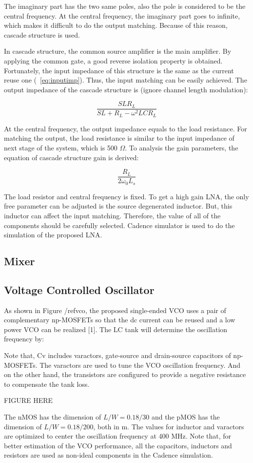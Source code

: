 The imaginary part has the two same poles, also the pole is considered to be the central frequency. At the central frequency, the imaginary part goes to infinite, which makes it difficult to do the output matching. Because of this reason, cascade structure is used.

In cascade structure, the common source amplifier is the main amplifier. By applying the common gate, a good reverse isolation property is obtained. Fortunately, the input impedance of this structure is the same as the current reuse one (~\ref{eq:inputimp}). Thus, the input matching can be easily achieved. The output impedance of the cascade structure is (ignore channel length modulation):

\begin{equation} 
  	\frac{SLR_L}{SL+R_L-\omega^2LCR_L}
\end{equation}

At the central frequency, the output impedance equals to the load resistance. For matching the output, the load resistance is similar to the input impedance of next stage of the system, which is 500 $\Omega$. To analysis the gain parameters, the equation of cascade structure gain is derived: 

\begin{equation} 
  	\frac{R_L}{2\omega_0L_s}
\end{equation}

The load resistor and central frequency is fixed. To get a high gain LNA, the only free parameter can be adjusted is the source degenerated inductor. But, this inductor can affect the input matching. Therefore, the value of all of the components should be carefully selected. Cadence simulator is used to do the simulation of the proposed LNA. 

\subsection{Mixer}

\subsection{Voltage Controlled Oscillator}
As shown in Figure /ref{vco}, the proposed single-ended VCO uses a pair of complementary np-MOSFETs so that the dc current can be reused and a low power VCO can be realized [1]. The LC tank will determine the oscillation frequency by:


Note that, Cv includes varactors, gate-source and drain-source capacitors of np-MOSFETs. The varactors are used to tune the VCO oscillation frequency. And on the other hand, the transistors are configured to provide a negative resistance to compensate the tank loss. 

FIGURE HERE

The nMOS has the dimension of $L/W=0.18/30$ and the pMOS has the dimension of $L/W=0.18/200$, both in m. The values for inductor and varactors are optimized to center the oscillation frequency at 400 MHz. Note that, for better estimation of the VCO performance, all the capacitors, inductors and resistors are used as non-ideal components in the Cadence simulation. 

